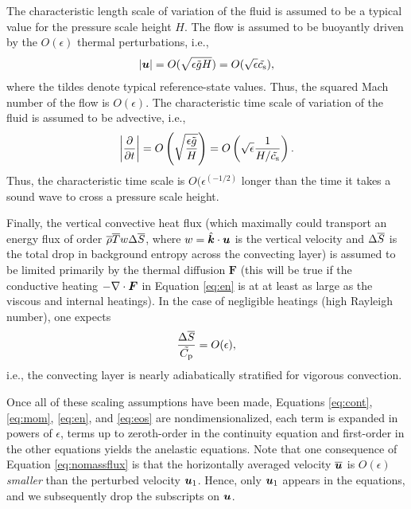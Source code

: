 \documentclass[12pt]{article}
\newcommand{\vecf}{\bm{F}}
\newcommand{\veck}{\hat{\bm{k}}}
\begin{document}
	The characteristic length scale of variation of the fluid is assumed to be a typical value for the pressure scale height $H$. The flow is assumed to be buoyantly driven by the $O(\epsilon)$ thermal perturbations, i.e., 
	\begin{align}\label{eq:scaleu}
		|\bm{u}| = O(\sqrt{\epsilon \tilde{g} H}) = O(\sqrt{\epsilon}\tilde{c_{\rm s}}),
	\end{align}
	where the tildes denote typical reference-state values. Thus, the squared Mach number of the flow is $O(\epsilon)$. The characteristic time scale of variation of the fluid is assumed to be advective, i.e., 
	\begin{align}\label{eq:scaleu}
	\left|\frac{\partial}{\partial t}\right| = O\left(\sqrt{\frac{\epsilon \tilde{g}}{H}}\right) = O\left(\sqrt{\epsilon} \frac{1}{H/\tilde{c_{\rm s}}}\right).
	\end{align}
	Thus, the characteristic time scale is $O(\epsilon^(-1/2)$ longer than the time it takes a sound wave to cross a pressure scale height. 
	
	Finally, the vertical convective heat flux (which maximally could transport an energy flux of order $\overline{\rho} \overline{T} w \Delta\overline{S}$, where $w=\veck\cdot\vecu$ is the vertical velocity and $\Delta \overline{S} $ is the total drop in background entropy across the convecting layer) is assumed to be limited primarily by the thermal diffusion $\vecf$ (this will be true if the conductive heating $-\Div \vecf$ in Equation \eqref{eq:en} is at at least as large as the viscous and internal heatings). In the case of negligible heatings (high Rayleigh number), one expects
	\begin{align}
		\frac{\Delta\overline{S}}{\tilde{C_{\rm{p}}}} = O(\epsilon),
	\end{align}
	i.e., the convecting layer is nearly adiabatically stratified for vigorous convection. 
	
	Once all of these scaling assumptions have been made, Equations \eqref{eq:cont}, \eqref{eq:mom}, \eqref{eq:en}, and \eqref{eq:eos} are nondimensionalized, each term is expanded in powers of $\epsilon$, terms up to zeroth-order in the continuity equation and first-order in the other equations yields the anelastic equations. Note that one consequence of Equation \eqref{eq:nomassflux} is that the horizontally averaged velocity $\overline{\bm{u}}$ is $O(\epsilon)$ \textit{smaller} than the perturbed velocity $\bm{u}_1$. Hence, only $\bm{u}_1$ appears in the equations, and we subsequently drop the subscripts on $\bm{u}$. 
	
\end{document}
